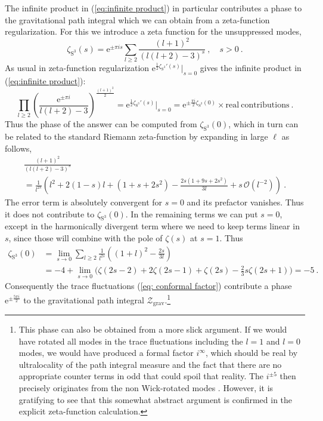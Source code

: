 \documentclass[12pt,a4paper]{article}
\renewcommand{\ge}{\geqslant}
\renewcommand{\geq}{\geqslant}
\begin{document}
The infinite product in (\ref{eq:infinite product}) in particular contributes a phase to the gravitational path integral \cite{Polchinski:1988ua} which we can obtain from a zeta-function regularization. For this we introduce a zeta function for the unsuppressed modes,
\begin{equation}\label{eq:zetas}
    \zeta_{\text{S}^3}(s) = \mathrm{e}^{\pm \pi i s}\sum_{l\geq 2}\frac{(l+1)^2}{(l(l+2)-3)^s}~,\quad s>0~.
\end{equation}
As usual in zeta-function regularization $\mathrm{e}^{\frac{1}{2}\zeta_{\text{S}^3}'(s)}|_{s=0}$ gives the infinite product in (\ref{eq:infinite product}):
\begin{equation}
  \prod_{l\ge 2}\left(\frac{\mathrm{e}^{\pm {\pi i}}}{l(l+2)-3}\right)^{\frac{(l+1)^2}{2}} = \mathrm{e}^{\frac{1}{2}\zeta_{\text{S}^3}'(s)}|_{s=0} = \mathrm{e}^{\pm \frac{\pi i}{2}\zeta_{\text{S}^3}(0)} \times \mathrm{real ~contributions}~. 
\end{equation}
Thus the phase of the answer can be computed from $\zeta_{\text{S}^3}(0)$, which in turn can be related to the standard Riemann zeta-function by expanding in large $\ell$ as follows,
\begin{multline}
     \frac{(l+1)^2}{(l(l+2)-3)^s} \\
     = \frac{1}{l^{2s}}\left(l^2+2(1-s)l+(1+s+2s^2)-\frac{2s(1+9s+2s^2)}{3l} + s \, \mathcal{O}(l^{-2})\right)~.
\end{multline}
The error term is absolutely convergent for $s=0$ and its prefactor vanishes. Thus it does not contribute to $\zeta_{\text{S}^3}(0)$. In the remaining terms we can put $s=0$, except in the harmonically divergent term where we need to keep terms linear in $s$, since those will combine with the pole of $\zeta(s)$ at $s=1$. Thus
\begin{align}
    \zeta_{\text{S}^3}(0)&= \lim_{s\rightarrow 0}\sum_{l \geq 2} \frac{1}{l^{2s}}\left(\!(1+l)^2 - \frac{2s}{3l}\!\right) \nonumber\\
    &=-4+ \lim_{s \to 0} \big(\zeta(2s-2)+2 \zeta(2s-1)+\zeta(2s)-\frac{2}{3} s \zeta(2s+1)\big)
    = -5~.
\end{align}
Consequently the trace fluctuations (\ref{eq: conformal factor}) contribute a phase $\mathrm{e}^{\pm \frac{5\pi i}{2}}$ to the gravitational path integral $\mathcal{Z}_{\mathrm{grav}}$.\footnote{This phase can also be obtained from a more slick argument. If we would have rotated all modes in the trace fluctuations including the $l=1$ and $l=0$ modes, we would have produced a formal factor $i^\infty$, which should be real by ultralocality of the path integral measure and the fact that there are no appropriate counter terms in odd that could spoil that reality. The $i^{\pm 5}$ then precisely originates from the non Wick-rotated modes \cite{Polchinski:1988ua}. However, it is gratifying to see that this somewhat abstract argument is confirmed in the explicit zeta-function calculation.} 
\end{document}
